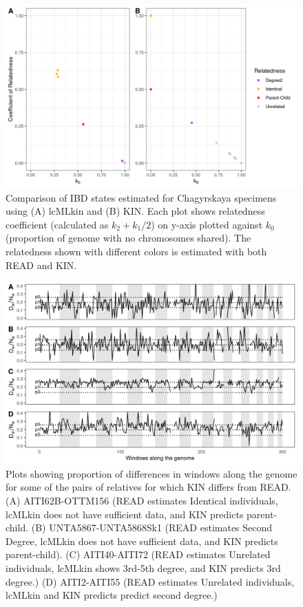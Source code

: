 \documentclass[12pt, letterpaper]{article}
\begin{document}
\begin{figure}[h!]
    \centering
    \includegraphics[width=18cm]{supplementary_info/plots/lcPlot.png}
    \caption{Comparison of IBD states estimated for Chagyrskaya specimens using (A) lcMLkin and (B) KIN. Each plot shows relatedness coefficient (calculated as $k_2+k_1/2$) on y-axis plotted against $k_0$ (proportion of genome with no chromosomes shared). The relatedness shown with different colors is estimated with both READ and KIN.}
    \label{figS6:Chagyrskaya_ibd}
\end{figure}




\begin{figure}[!ht]
    \centering
    \includegraphics[width=18cm]{supplementary_info/plots/egplot1.png}
    \caption{Plots showing proportion of differences in windows along the genome for some of the pairs of relatives for which KIN differs from READ. (A) AITI62B-OTTM156 (READ estimates Identical individuals, lcMLkin does not have sufficient data, and KIN predicts parent-child. (B) UNTA5867-UNTA5868Sk1 (READ estimates Second Degree, lcMLkin does not have sufficient data, and KIN predicts parent-child). (C) AITI40-AITI72 (READ estimates Unrelated individuals, lcMLkin shows 3rd-5th degree, and KIN predicts 3rd degree.)
    (D) AITI2-AITI55 (READ estimates Unrelated individuals, lcMLkin and KIN predicts predict second degree.)}
    \label{figS8:eg1}
\end{figure}
\end{document}
